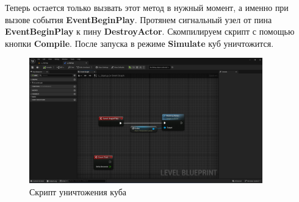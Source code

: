Теперь остается только вызвать этот метод в нужный момент, а именно при вызове события \textbf{EventBeginPlay}. Протянем сигнальный узел от пина \textbf{EventBeginPlay} к пину \textbf{DestroyActor}. Скомпилируем скрипт с помощью кнопки \textbf{Compile}. После запуска в режиме \textbf{Simulate} куб уничтожится.

\begin{figure}[h]
    \centering
    \includegraphics[width=0.9\textwidth]{Lections/DestroyCubeBeginPlay.png}
    \caption{Скрипт уничтожения куба}
\end{figure}

